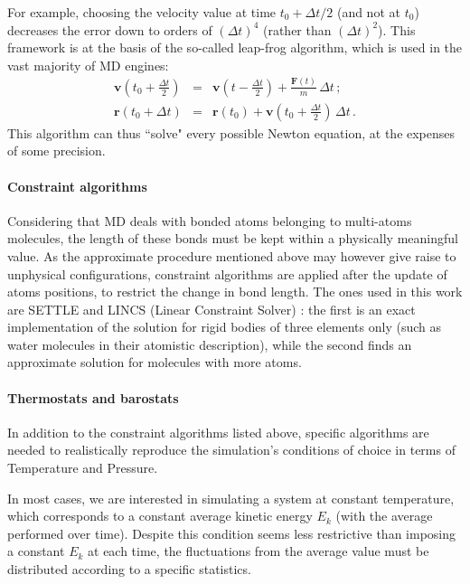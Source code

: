 For example, choosing the velocity value at time $t_0 + \Delta t/2$ (and not at $t_0$) decreases the error down to orders of $(\Delta t)^4$ (rather than $(\Delta t)^2$). This framework is at the basis of the so-called leap-frog algorithm, which is used in the vast majority of MD engines:
\begin{eqnarray}
\mathbf{v}\left(t_0 + \frac{\Delta t}{2}\right) &=& \mathbf{v}\left(t - \frac{\Delta t}{2}\right) + \frac{\mathbf{F}(t)}{m} \, \Delta t \, ; \\
\mathbf{r}(t_0 + \Delta t) &=& \mathbf{r}(t_0) + \mathbf{v}\left(t_0 + \frac{\Delta t}{2}\right) \, \Delta t \, .
\end{eqnarray}
This algorithm can thus ``solve" every possible Newton equation, at the expenses of some precision.

\paragraph{Constraint algorithms} Considering that MD deals with bonded atoms belonging to multi-atoms molecules, the length of these bonds must be kept within a physically meaningful value. As the approximate procedure mentioned above may however give raise to unphysical configurations, constraint algorithms are applied after the update of atoms positions, to restrict the change in bond length. The ones used in this work are SETTLE \citep{Miyamoto1992} and LINCS (Linear Constraint Solver) \citep{Hess1997}: the first is an exact implementation of the solution for rigid bodies of three elements only (such as water molecules in their atomistic description), while the second finds an approximate solution for molecules with more atoms.

\paragraph{Thermostats and barostats} In addition to the constraint algorithms listed above, specific algorithms are needed to realistically reproduce the simulation's conditions of choice in terms of Temperature and Pressure.

In most cases, we are interested in simulating a system at constant temperature, which corresponds to a constant average kinetic energy $E_k$ (with the average performed over time).
%
Despite this condition seems less restrictive than imposing a constant $E_k$ at each time, the fluctuations from the average value must be distributed according to a specific statistics.

